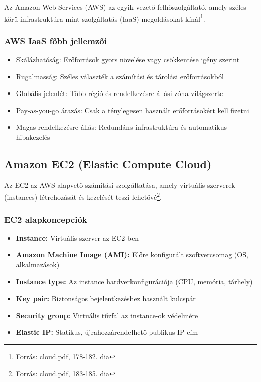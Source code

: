 \documentclass[a4paper,12pt]{article}
\begin{document}
    Az Amazon Web Services (AWS) az egyik vezető felhőszolgáltató, amely széles körű infrastruktúra mint szolgáltatás (IaaS) megoldásokat kínál\footnote{Forrás: cloud.pdf, 178-182. dia}.

    \subsubsection{AWS IaaS főbb jellemzői}

    \begin{itemize}
        \item Skálázhatóság: Erőforrások gyors növelése vagy csökkentése igény szerint
        \item Rugalmasság: Széles választék a számítási és tárolási erőforrásokból
        \item Globális jelenlét: Több régió és rendelkezésre állási zóna világszerte
        \item Pay-as-you-go árazás: Csak a ténylegesen használt erőforrásokért kell fizetni
        \item Magas rendelkezésre állás: Redundáns infrastruktúra és automatikus hibakezelés
    \end{itemize}

    \subsection{Amazon EC2 (Elastic Compute Cloud)}

    Az EC2 az AWS alapvető számítási szolgáltatása, amely virtuális szerverek (instances) létrehozását és kezelését teszi lehetővé\footnote{Forrás: cloud.pdf, 183-185. dia}.

    \subsubsection{EC2 alapkoncepciók}

    \begin{itemize}
        \item \textbf{Instance:} Virtuális szerver az EC2-ben
        \item \textbf{Amazon Machine Image (AMI):} Előre konfigurált szoftvercsomag (OS, alkalmazások)
        \item \textbf{Instance type:} Az instance hardverkonfigurációja (CPU, memória, tárhely)
        \item \textbf{Key pair:} Biztonságos bejelentkezéshez használt kulcspár
        \item \textbf{Security group:} Virtuális tűzfal az instance-ok védelmére
        \item \textbf{Elastic IP:} Statikus, újrahozzárendelhető publikus IP-cím
    \end{itemize}
\end{document}
